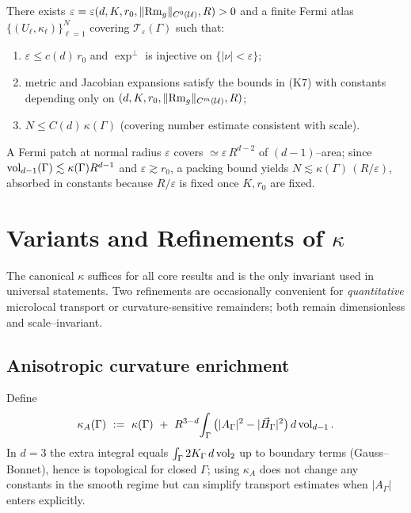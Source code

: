 \begin{proposition}
\label{prop:uniform-atlas}
There exists $\varepsilon=\varepsilon(d,K,r_0,\|{\rm Rm}_g\|_{C^0(\mathcal{U})},R)>0$ and a finite Fermi atlas $\{(U_\ell,\kappa_\ell)\}_{\ell=1}^N$ covering $\mathcal{T}_\varepsilon(\Gamma)$ such that:
\begin{enumerate}
\item $\varepsilon\le c(d)\, r_0$ and $\exp^\perp$ is injective on $\{|\nu|<\varepsilon\}$;
\item metric and Jacobian expansions satisfy the bounds in \textup{(K7)} with constants depending only on $(d,K,r_0,\|{\rm Rm}_g\|_{C^m(\mathcal{U})},R)$;
\item $N\le C(d)\,\kappa(\Gamma)$ (covering number estimate consistent with scale).
\end{enumerate}
\end{proposition}

\begin{remark}
A Fermi patch at normal radius $\varepsilon$ covers $\simeq \varepsilon\,R^{d-2}$ of $(d\!-\!1)$–area; since $\operatorname{vol}_{d-1}(\Gamma)\lesssim \kappa(\Gamma)R^{d-1}$ and $\varepsilon\gtrsim r_0$, a packing bound yields $N\lesssim \kappa(\Gamma)\,(R/\varepsilon)$, absorbed in constants because $R/\varepsilon$ is fixed once $K,r_0$ are fixed.
\end{remark}

\bigskip

\section{Variants and Refinements of \texorpdfstring{$\kappa$}{kappa}}
\label{sec:variants}

The canonical $\kappa$ suffices for all core results and is the only invariant used in universal statements. Two refinements are occasionally convenient for \emph{quantitative} microlocal transport or curvature-sensitive remainders; both remain dimensionless and scale–invariant.

\subsection{Anisotropic curvature enrichment}
Define
\[
\kappa_A(\Gamma)\ :=\ \kappa(\Gamma)\ +\ R^{3-d}\!\int_\Gamma \big(|A_\Gamma|^2-|\vec H_\Gamma|^2\big)\,d\vol_{d-1}.
\]
In $d=3$ the extra integral equals $\int_\Gamma 2K_\Gamma\,d\operatorname{vol}_{2}$ up to boundary terms (Gauss–Bonnet), hence is topological for closed $\Gamma$; using $\kappa_A$ does not change any constants in the smooth regime but can simplify transport estimates when $|A_\Gamma|$ enters explicitly.

